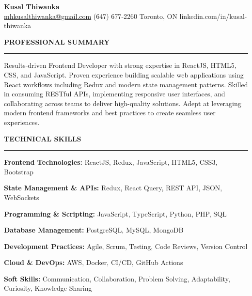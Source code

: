 \documentclass[10pt,letterpaper]{article}
\begin{document}
\begin{center}
{\LARGE\textbf{Kusal Thiwanka}}\\[3pt]
\href{mailto:mhkusalthiwanka@gmail.com}{mhkusalthiwanka@gmail.com}\hspace{2em}%
(647) 677{-}2260\hspace{2em}%
Toronto, ON\hspace{2em}
linkedin.com/in/kusal-thiwanka
\end{center}

\vspace{6pt}

\textbf{PROFESSIONAL SUMMARY}\\[-8pt]
\noindent\rule{\textwidth}{1pt}

\vspace{-2pt}

Results-driven Frontend Developer with strong expertise in ReactJS, HTML5, CSS, and JavaScript. Proven experience building scalable web applications using React workflows including Redux and modern state management patterns. Skilled in consuming RESTful APIs, implementing responsive user interfaces, and collaborating across teams to deliver high-quality solutions. Adept at leveraging modern frontend frameworks and best practices to create seamless user experiences.

\vspace{8pt}

\textbf{TECHNICAL SKILLS}\\[-8pt]
\noindent\rule{\textwidth}{1pt}

\vspace{-2pt}

\textbf{Frontend Technologies:} ReactJS, Redux, JavaScript, HTML5, CSS3, Bootstrap

\textbf{State Management \& APIs:} Redux, React Query, REST API, JSON, WebSockets

\textbf{Programming \& Scripting:} JavaScript, TypeScript, Python, PHP, SQL

\textbf{Database Management:} PostgreSQL, MySQL, MongoDB

\textbf{Development Practices:} Agile, Scrum, Testing, Code Reviews, Version Control

\textbf{Cloud \& DevOps:} AWS, Docker, CI/CD, GitHub Actions

\textbf{Soft Skills:} Communication, Collaboration, Problem Solving, Adaptability, Curiosity, Knowledge Sharing

\vspace{8pt}
\end{document}
